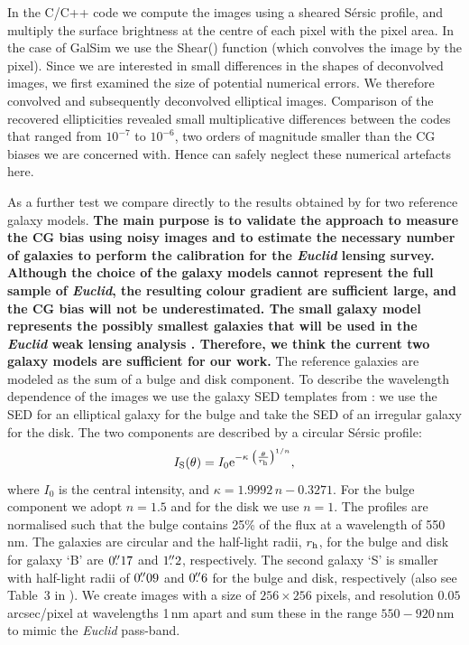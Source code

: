 \documentclass[useAMS,usenatbib]{mnras}
\newcommand{\be}{\begin{equation}}
\newcommand{\ee}{\end{equation}}
\begin{document}
In the C/C++ code we compute the images using a sheared S{\'e}rsic
profile, and multiply the surface brightness at the centre of each
pixel with the pixel area. In the case of {\sc GalSim} we use the {\sc
  Shear()} function (which convolves the image by the pixel). Since we
are interested in small differences in the shapes of deconvolved
images, we first examined the size of potential numerical errors. We
therefore convolved and subsequently deconvolved elliptical
images. Comparison of the recovered ellipticities revealed small
multiplicative differences between the codes that ranged from
$10^{-7}$ to $10^{-6}$, two orders of magnitude smaller than the CG
biases we are concerned with. Hence can safely neglect these numerical
artefacts here.

As a further test we compare directly to the results obtained by  for two reference galaxy models. {\bf The main purpose is to validate the approach to measure the CG bias using noisy images and to estimate the necessary number of galaxies to perform the calibration for the {\it Euclid} lensing survey. Although the choice of the galaxy models cannot represent the full sample of {\it Euclid}, the resulting colour gradient are sufficient large, and the CG bias will not be underestimated. The small galaxy model represents the possibly smallest galaxies that will be used in the {\it Euclid} weak lensing analysis \citep{Massey13}. Therefore, we think the current two galaxy models are sufficient for our work.}
The reference galaxies are modeled as the sum of a bulge and disk component. To describe the wavelength dependence of the images we use the galaxy SED templates from \citet{1980ApJS...43..393C}: we use the SED for an elliptical galaxy for the bulge and take the SED of an irregular galaxy for the disk. The two components are  described by a circular S{\'e}rsic profile:
\be
I_{\rm S}(\theta) = I_0 {\rm e}^{-\kappa\; \left(\frac{\theta}{r_{\rm h}}\right)^{1/n}},
\ee
%
where $I_0$ is the central intensity, and $\kappa=1.9992\,n -0.3271$. For the bulge component we adopt $n=1.5$ and for the disk we use $n=1$. The profiles are normalised such that the bulge contains 25\% of the flux at a wavelength of 550\,nm. The galaxies are circular and the half-light radii, $r_{\rm h}$, for the bulge and disk for galaxy `B'   are $0\hbox{$.\!\!^{\prime\prime}$}17$ and $1\hbox{$.\!\!^{\prime\prime}$}2$, respectively. The second galaxy `S' is smaller with half-light radii of $0\hbox{$.\!\!^{\prime\prime}$}09$ and $0\hbox{$.\!\!^{\prime\prime}$}6$  for the bulge and disk, respectively (also see Table~3 in ). We create images with a size of  $256\times256$ pixels, and resolution $0.05$ arcsec/pixel at wavelengths 1\,nm apart and sum these in the range $550-920$\,nm to mimic the {\it Euclid} pass-band.
\end{document}
